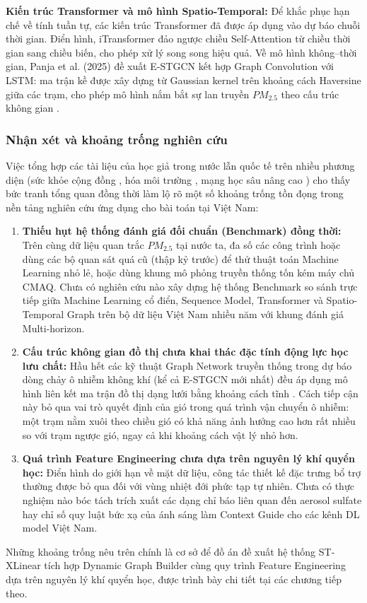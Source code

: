 \textbf{Kiến trúc Transformer và mô hình Spatio-Temporal:} Để khắc phục hạn chế về tính tuần tự, các kiến trúc Transformer đã được áp dụng vào dự báo chuỗi thời gian. Điển hình, iTransformer \cite{liu2024itransformer} đảo ngược chiều Self-Attention từ chiều thời gian sang chiều biến, cho phép xử lý song song hiệu quả. Về mô hình không--thời gian, Panja et al. (2025) đề xuất E-STGCN kết hợp Graph Convolution với LSTM: ma trận kề được xây dựng từ Gaussian kernel trên khoảng cách Haversine giữa các trạm, cho phép mô hình nắm bắt sự lan truyền $PM_{2.5}$ theo cấu trúc không gian \cite{panja2025estgcn}. 

\subsubsection{Nhận xét và khoảng trống nghiên cứu}

Việc tổng hợp các tài liệu của học giả trong nước lẫn quốc tế trên nhiều phương diện (sức khỏe cộng đồng \cite{hoang2023health}, hóa môi trường \cite{ho2025assessment}, mạng học sâu nâng cao \cite{liu2024itransformer}) cho thấy bức tranh tổng quan đồng thời làm lộ rõ một số khoảng trống tồn đọng trong nền tảng nghiên cứu ứng dụng cho bài toán tại Việt Nam:

\begin{enumerate}
    \item \textbf{Thiếu hụt hệ thống đánh giá đối chuẩn (Benchmark) đồng thời:} Trên cùng dữ liệu quan trắc $PM_{2.5}$ tại nước ta, đa số các công trình hoặc dùng các bộ quan sát quá cũ (thập kỷ trước) để thử thuật toán Machine Learning nhỏ lẻ, hoặc dùng khung mô phỏng truyền thống tốn kém máy chủ CMAQ. Chưa có nghiên cứu nào xây dựng hệ thống Benchmark so sánh trực tiếp giữa Machine Learning cổ điển, Sequence Model, Transformer và Spatio-Temporal Graph trên bộ dữ liệu Việt Nam nhiều năm với khung đánh giá Multi-horizon.
    
    \item \textbf{Cấu trúc không gian đồ thị chưa khai thác đặc tính động lực học lưu chất:} Hầu hết các kỹ thuật Graph Network truyền thống trong dự báo dòng chảy ô nhiễm không khí (kể cả E-STGCN mới nhất) đều áp dụng mô hình liên kết ma trận đồ thị dạng lưới bằng khoảng cách tĩnh \cite{panja2025estgcn}. Cách tiếp cận này bỏ qua vai trò quyết định của gió trong quá trình vận chuyển ô nhiễm: một trạm nằm xuôi theo chiều gió có khả năng ảnh hưởng cao hơn rất nhiều so với trạm ngược gió, ngay cả khi khoảng cách vật lý nhỏ hơn.
    
    \item \textbf{Quá trình Feature Engineering chưa dựa trên nguyên lý khí quyển học:} Điển hình do giới hạn về mặt dữ liệu, công tác thiết kế đặc trưng bổ trợ thường được bỏ qua đối với vùng nhiệt đới phức tạp tự nhiên. Chưa có thực nghiệm nào bóc tách trích xuất các dạng chỉ báo liên quan đến aerosol sulfate hay chỉ số quy luật bức xạ của ánh sáng làm Context Guide cho các kênh DL model Việt Nam.
\end{enumerate}

Những khoảng trống nêu trên chính là cơ sở để đồ án đề xuất hệ thống ST-XLinear tích hợp Dynamic Graph Builder cùng quy trình Feature Engineering dựa trên nguyên lý khí quyển học, được trình bày chi tiết tại các chương tiếp theo.

